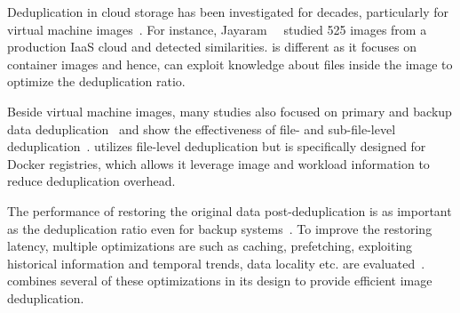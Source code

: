 Deduplication in cloud storage has been investigated for decades, particularly for virtual machine
images~\cite{zhou2013characterizing,srinivasan2012idedup,jin2009effectiveness}.
%
For instance, Jayaram~\etal~\cite{jayaram2011empirical} studied 525 images
from a production IaaS cloud and detected similarities. 
 \sysname is different as it focuses on container images and hence, can exploit
 knowledge about files inside the image to optimize the deduplication ratio.
 
Beside virtual machine images, many studies also focused on primary and backup data
deduplication~\cite{tarasov2014dmdedup,muthitacharoen2001low,lu2012insights,2009-sparse_indexing_inline_dedup_using_sampling-fast,2013-charact_increment_changes_data_protect-atc,wallace2012characteristics,zhu2008avoiding}
and show the effectiveness of file- and sub-file-level
deduplication~\cite{2012-hpc_practical_dedup_study-sc,msst16dedup-study}.
%
\sysname utilizes file-level deduplication but is specifically designed for Docker registries,
which allows it leverage image and workload information to reduce deduplication overhead.
%


The performance of restoring the original data post-deduplication is as important as the deduplication ratio  even for backup systems~\cite{lillibridge2013improving}.
%
To improve the restoring latency, multiple optimizations are such as caching, prefetching, exploiting
historical information and temporal trends, data locality etc. are evaluated~\cite{fu2014accelerating,fu2015design,fu2011aa}. 
%
\sysname combines several of these optimizations in its design to provide efficient
image deduplication.
%


